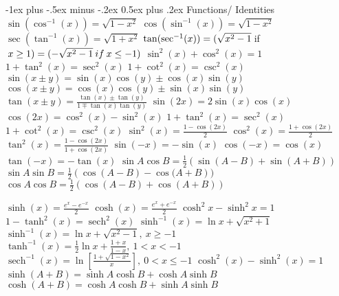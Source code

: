\documentclass[10pt,a4paper,landscape]{article}
\makeatletter
\DeclareMathOperator{\sech}{sech}
\renewcommand{\section}{\@startsection{section}{1}{0mm}%
{-1ex plus -.5ex minus -.2ex}%
{0.5ex plus .2ex}%
{\normalfont\large\bfseries}}
\makeatother
\begin{document}
\begin{multicols*}{5}
	\section{Functions/ Identities}
	$\sin(\cos^{-1}(x)) = \sqrt{1-x^2}$\newline
	$\cos(\sin^{-1}(x)) = \sqrt{1-x^2} $\newline
	$\sec(\tan^{-1}(x)) = \sqrt{1+x^2} $\newline
	$\tan(\sec^{-1}(x)) \newline = (\sqrt{x^2-1} \: $if$ \: x \ge 1)\newline =(-\sqrt{x^2-1} \: if \: x \le -1)$
	$ \sin^2(x)+\cos^2(x) = 1 $\newline
	$ 1+\tan^2(x) = \sec^2(x) $\newline
	$ 1+\cot^2(x) = \csc^2(x) $\newline
	$ \sin(x\pm y) = \sin(x)\cos(y)\pm\cos(x)\sin(y) $\newline
	$ \cos(x\pm y) = \cos(x)\cos(y)\pm\sin(x)\sin(y) $\newline
	$ \tan(x\pm y) = \frac{\tan(x)\pm\tan(y)}{1 \mp \tan(x)\tan(y)} $\newline
	$ \sin(2x) = 2\sin(x)\cos(x) $\newline
	$ \cos(2x) = \cos^{2}(x) - \sin^{2}(x) $\newline
	$ 1+\tan^2(x) = \sec^2(x) $\newline
	$ 1+\cot^2(x) = \csc^2(x) $\newline
	$ \sin^2(x) = \frac{1-\cos(2x)}{2} $\newline
	$ \cos^2(x) = \frac{1+\cos(2x)}{2} $\newline
	$ \tan^2(x) = \frac{1-\cos(2x)}{1+\cos(2x)} $\newline
	$ \sin(-x) = -\sin(x) $\newline
	$ \cos(-x) = \cos(x) $\newline
	$ \tan(-x) = -\tan(x) $\newline
	$ \sin{ A } \cos{ B } = \frac{1}{2} ( \sin{( A-B )} + \sin{( A+B )}   ) $
	$ \sin{ A } \sin{ B } = \frac{1}{2} ( \cos{( A-B )} - \cos{( A+B }   )) $
	$ \cos{ A } \cos{ B } = \frac{1}{2} ( \cos{ (A-B) } + \cos{ (A+B) }   ) $

\noindent\hrulefill 

	$\sinh(x) = \frac{e^{x}-e^{-x}}{2} $\newline
	$\cosh(x) = \frac{e^{x}+e^{-x}}{2} $\newline
	$ \cosh^{2}x-\sinh^{2}x = 1 $\newline
	$ 1-\tanh^2(x) = \sech^2(x) $
	$\sinh^{-1}(x) = \ln{x+\sqrt{x^2+1}} $\newline
	$\sinh^{-1}(x) = \ln{x+\sqrt{x^2-1}}, \: x \ge -1 $\newline
	$\tanh^{-1}(x) = \frac{1}{2}\ln{x+\frac{1+x}{1-x}}, \: 1 < x < -1 $\newline
	$\sech^{-1}(x) = \ln[{\frac{1+\sqrt{1-x^2}}{x}}], \: 0 < x \le -1 $\newline
	$ \cosh^2(x) - \sinh^2(x) = 1 $\newline
	$ \sinh{ (A+B) } = \sinh A \cosh B + \cosh A \sinh B  $
	$ \cosh{ (A+B) } = \cosh A \cosh B + \sinh A \sinh B  $

\end{multicols*}
\end{document}
